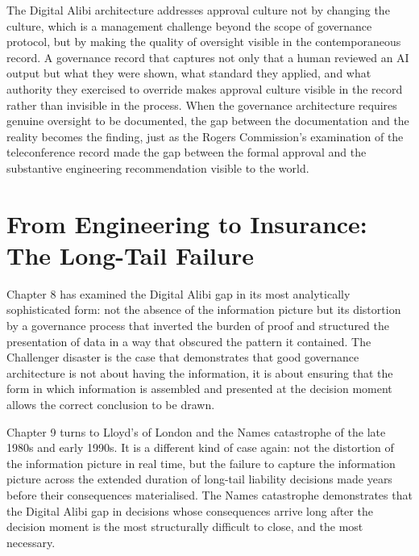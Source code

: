 The Digital Alibi architecture addresses approval culture not by changing the culture, which is a management challenge beyond the scope of governance protocol, but by making the quality of oversight visible in the contemporaneous record. A governance record that captures not only that a human reviewed an AI output but what they were shown, what standard they applied, and what authority they exercised to override makes approval culture visible in the record rather than invisible in the process. When the governance architecture requires genuine oversight to be documented, the gap between the documentation and the reality becomes the finding, just as the Rogers Commission's examination of the teleconference record made the gap between the formal approval and the substantive engineering recommendation visible to the world.

\scenebreak

\section{From Engineering to Insurance: The Long-Tail Failure}

Chapter 8 has examined the Digital Alibi gap in its most analytically sophisticated form: not the absence of the information picture but its distortion by a governance process that inverted the burden of proof and structured the presentation of data in a way that obscured the pattern it contained. The Challenger disaster is the case that demonstrates that good governance architecture is not about having the information, it is about ensuring that the form in which information is assembled and presented at the decision moment allows the correct conclusion to be drawn.

Chapter 9 turns to Lloyd's of London and the Names catastrophe of the late 1980s and early 1990s. It is a different kind of case again: not the distortion of the information picture in real time, but the failure to capture the information picture across the extended duration of long-tail liability decisions made years before their consequences materialised. The Names catastrophe demonstrates that the Digital Alibi gap in decisions whose consequences arrive long after the decision moment is the most structurally difficult to close, and the most necessary.
